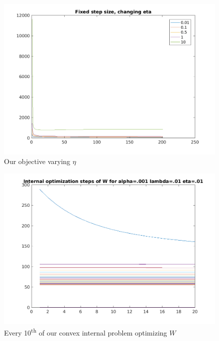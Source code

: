\documentclass{article}
\newcommand{\0}{\mathrm{0}}
\newcommand{\1}{\mathrm{1}}
\begin{document}
\begin{figure}
  \includegraphics[width=\textwidth]{fixed-step-eta.png}
  \caption{Our objective varying $\eta$}
\end{figure}

\begin{figure}
  \includegraphics[width=\textwidth]{fixed-step-internal-W.png}
  \caption{Every 10\textsuperscript{th} of our convex internal problem optimizing $W$}
\end{figure}
\end{document}
